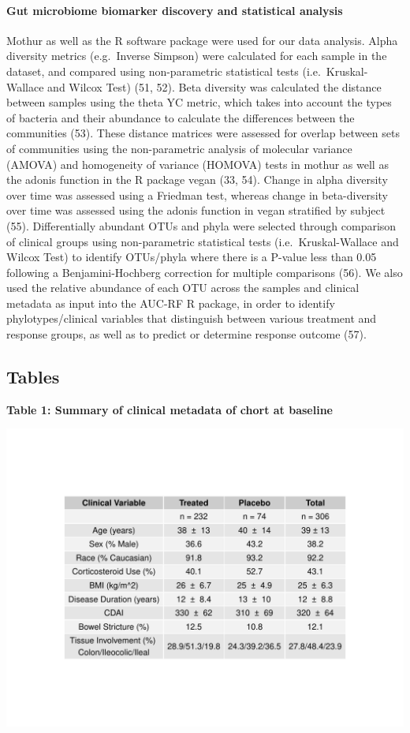 \documentclass[11pt,]{article}
\let\oldparagraph\paragraph
\renewcommand{\paragraph}[1]{\oldparagraph{#1}\mbox{}}
\begin{document}
\paragraph{Gut microbiome biomarker discovery and statistical
analysis}\label{gut-microbiome-biomarker-discovery-and-statistical-analysis}

Mothur as well as the R software package were used for our data
analysis. Alpha diversity metrics (e.g.~Inverse Simpson) were calculated
for each sample in the dataset, and compared using non-parametric
statistical tests (i.e.~Kruskal-Wallace and Wilcox Test) (51, 52). Beta
diversity was calculated the distance between samples using the theta YC
metric, which takes into account the types of bacteria and their
abundance to calculate the differences between the communities (53).
These distance matrices were assessed for overlap between sets of
communities using the non-parametric analysis of molecular variance
(AMOVA) and homogeneity of variance (HOMOVA) tests in mothur as well as
the adonis function in the R package vegan (33, 54). Change in alpha
diversity over time was assessed using a Friedman test, whereas change
in beta-diversity over time was assessed using the adonis function in
vegan stratified by subject (55). Differentially abundant OTUs and phyla
were selected through comparison of clinical groups using non-parametric
statistical tests (i.e.~Kruskal-Wallace and Wilcox Test) to identify
OTUs/phyla where there is a P-value less than 0.05 following a
Benjamini-Hochberg correction for multiple comparisons (56). We also
used the relative abundance of each OTU across the samples and clinical
metadata as input into the AUC-RF R package, in order to identify
phylotypes/clinical variables that distinguish between various treatment
and response groups, as well as to predict or determine response outcome
(57).

\newpage

\subsection{Tables}\label{tables}

\textbf{Table 1: Summary of clinical metadata of chort at baseline}

\includegraphics{tables/SupTable1_baseline_metadata.pdf}
\end{document}
